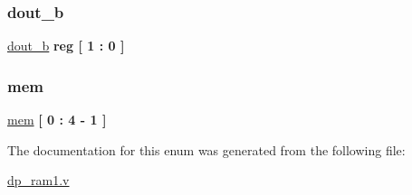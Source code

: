 \mbox{\label{enumdp__ram1_a4327a084334b83771955774170bc914d}} 
\subsubsection{\texorpdfstring{dout\+\_\+b}{dout\_b}}
{\footnotesize\ttfamily \mbox{\hyperlink{enumdp__ram1_a4327a084334b83771955774170bc914d}{dout\+\_\+b}} {\bfseries \textcolor{vhdlchar}{reg}\textcolor{vhdlchar}{ }\textcolor{vhdlchar}{\mbox{[}}\textcolor{vhdlchar}{ } \textcolor{vhdldigit}{1} \textcolor{vhdlchar}{ }\textcolor{vhdlchar}{\+:}\textcolor{vhdlchar}{ } \textcolor{vhdldigit}{0} \textcolor{vhdlchar}{ }\textcolor{vhdlchar}{\mbox{]}}\textcolor{vhdlchar}{ }} \hspace{0.3cm}}

\mbox{\label{enumdp__ram1_a151b37d47c7281cd78824f9bfa6179ab}} 
\subsubsection{\texorpdfstring{mem}{mem}}
{\footnotesize\ttfamily \mbox{\hyperlink{enumdp__ram1_a151b37d47c7281cd78824f9bfa6179ab}{mem}} {\bfseries \textcolor{vhdlchar}{\mbox{[}}\textcolor{vhdlchar}{ } \textcolor{vhdldigit}{0} \textcolor{vhdlchar}{ }\textcolor{vhdlchar}{\+:}\textcolor{vhdlchar}{ } \textcolor{vhdldigit}{4} \textcolor{vhdlchar}{-\/} \textcolor{vhdldigit}{1} \textcolor{vhdlchar}{ }\textcolor{vhdlchar}{\mbox{]}}\textcolor{vhdlchar}{ }} \hspace{0.3cm}}



The documentation for this enum was generated from the following file\+:\begin{DoxyCompactItemize}
\item 
\mbox{\hyperlink{dp__ram1_8v}{dp\+\_\+ram1.\+v}}\end{DoxyCompactItemize}
